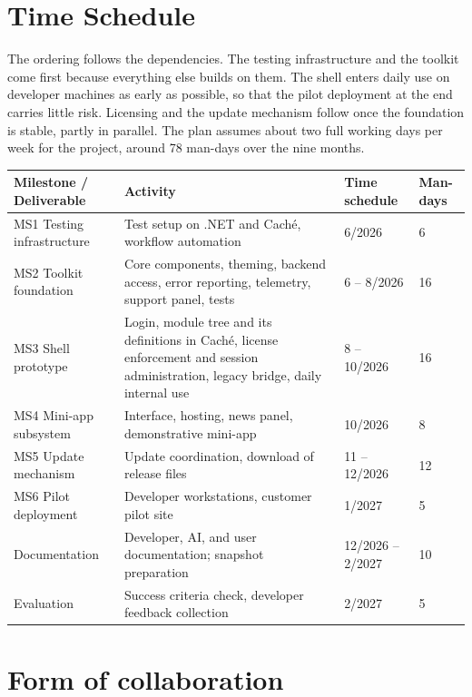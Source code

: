 \documentclass{article}
\begin{document}
\section{Time Schedule}
\label{sec:schedule}

The ordering follows the dependencies. The testing infrastructure and the toolkit come first because everything else builds on them. The shell enters daily use on developer machines as early as possible, so that the pilot deployment at the end carries little risk. Licensing and the update mechanism follow once the foundation is stable, partly in parallel. The plan assumes about two full working days per week for the project, around 78 man-days over the nine months.

\medskip
\hskip-0.5cm
\begin{tabular}{ | >{\raggedright}m{11em} | m{23em} | m{2.5cm} | m{1.3cm} | }
   \hline
 Milestone / Deliverable & Activity & Time schedule & Man-days \\
 \hline
 MS1 Testing infrastructure & Test setup on .NET and Caché, workflow automation & 6/2026 & 6 \\
 \hline
 MS2 Toolkit foundation & Core components, theming, backend access, error reporting, telemetry, support panel, tests & 6 -- 8/2026 & 16 \\
 \hline
 MS3 Shell prototype & Login, module tree and its definitions in Caché, license enforcement and session administration, legacy bridge, daily internal use & 8 -- 10/2026 & 16 \\
 \hline
 MS4 Mini-app subsystem & Interface, hosting, news panel, demonstrative mini-app & 10/2026 & 8 \\
 \hline
 MS5 Update mechanism & Update coordination, download of release files & 11 -- 12/2026 & 12 \\
 \hline
 MS6 Pilot deployment & Developer workstations, customer pilot site & 1/2027 & 5 \\
 \hline
 Documentation & Developer, AI, and user documentation; snapshot preparation & 12/2026 -- 2/2027 & 10 \\
 \hline
 Evaluation & Success criteria check, developer feedback collection & 2/2027 & 5 \\
 \hline
\end{tabular}

\section{Form of collaboration}
\label{sec:collaboration}
\end{document}
